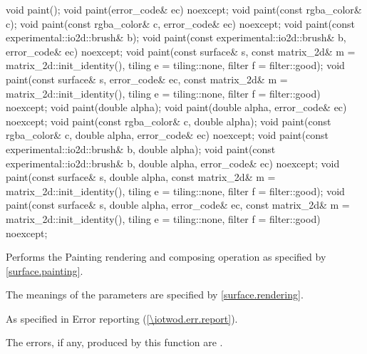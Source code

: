 \begin{itemdecl}
void paint();
void paint(error_code& ec) noexcept;
void paint(const rgba_color& c);
void paint(const rgba_color& c, error_code& ec) noexcept;
void paint(const experimental::io2d::brush& b);
void paint(const experimental::io2d::brush& b, error_code& ec) noexcept;
void paint(const surface& s,
  const matrix_2d& m = matrix_2d::init_identity(), tiling e = tiling::none,
  filter f = filter::good);
void paint(const surface& s, error_code& ec,
  const matrix_2d& m = matrix_2d::init_identity(), tiling e = tiling::none,
  filter f = filter::good) noexcept;
void paint(double alpha);
void paint(double alpha, error_code& ec) noexcept;
void paint(const rgba_color& c, double alpha);
void paint(const rgba_color& c, double alpha, error_code& ec) noexcept;
void paint(const experimental::io2d::brush& b, double alpha);
void paint(const experimental::io2d::brush& b, double alpha,
  error_code& ec) noexcept;
void paint(const surface& s, double alpha,
  const matrix_2d& m = matrix_2d::init_identity(), tiling e = tiling::none, 
  filter f = filter::good);
void paint(const surface& s, double alpha, error_code& ec, 
  const matrix_2d& m = matrix_2d::init_identity(), tiling e = tiling::none,
  filter f = filter::good) noexcept;
\end{itemdecl}
\begin{itemdescr}
\pnum
\effects
Performs the Painting rendering and composing operation as specified by \ref{surface.painting}.

\pnum
The meanings of the parameters are specified by \ref{surface.rendering}.

\pnum
\throws
As specified in Error reporting (\ref{\iotwod.err.report}).

\pnum
\errors
The errors, if any, produced by this function are .
\end{itemdescr}

